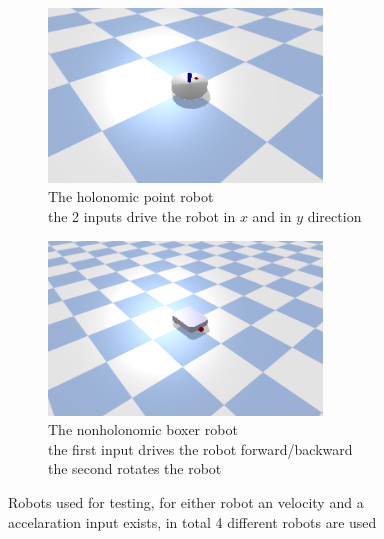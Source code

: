 \begin{figure}[H]
    \centering
    \begin{subfigure}{.5\textwidth}
    \centering
    \includegraphics[width=0.8\textwidth]{figures/point_robot.png}
    \caption{The holonomic point robot\\the 2 inputs drive the robot in $x$ and in $y$ direction}
    \label{subfig:example_point_robot_todo_rename_this}
    \end{subfigure}%
    \begin{subfigure}{.5\textwidth}
    \centering
    \includegraphics[width=0.8\textwidth]{figures/boxer_robot.png}
    \caption{The nonholonomic boxer robot\\the first input drives the robot forward/backward\\the second rotates the robot}
    \label{subfig:example_boxer_robot_todo_rename_this}
    \end{subfigure}%
    \caption{Robots used for testing, for either robot an velocity and a accelaration input exists, in total 4 different robots are used}
    \label{fig:example_robots_change_ref_please}

\end{figure}

